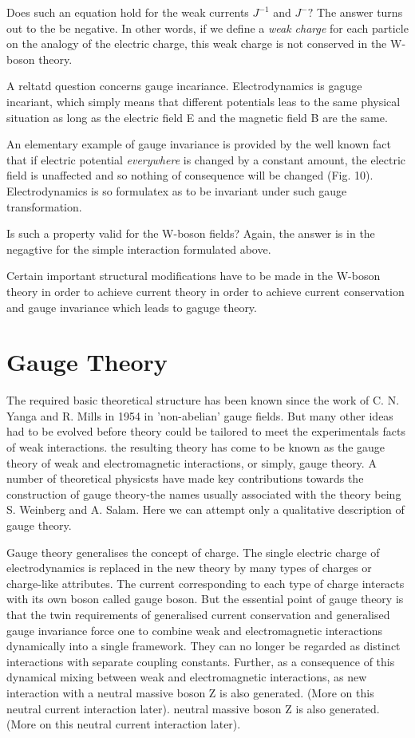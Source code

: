 Does such an equation hold for the weak currents $J^{-1}$ and $J^{-} ?$ The answer turns out to the be negative. In other words, if we define a {\it weak charge} for each particle on the analogy of the electric charge, this weak charge is not conserved in the W-boson theory.

A reltatd question concerns gauge incariance. Electrodynamics is gaguge incariant, which simply means that different potentials leas to the same physical situation as long as the electric field E and the magnetic field B are the same.

An elementary example of gauge invariance is provided by the well known fact that if electric potential {\it everywhere} is changed by a constant amount, the electric field is unaffected and so nothing of consequence will be changed (Fig. 10). Electrodynamics is so formulatex as to be invariant under such gauge transformation.

Is such a property valid for the W-boson fields? Again, the answer is in the negagtive for the simple interaction formulated above.

Certain important structural modifications have to be made in the W-boson theory in order to achieve current theory in order to achieve current conservation and gauge invariance which leads to gaguge theory.

\section*{Gauge Theory}

The required basic theoretical structure has been known since the work of C. N. Yanga and R. Mills in 1954 in 'non-abelian' gauge fields. But many other ideas had to be evolved before theory could be tailored to meet the experimentals facts of weak interactions. the resulting theory has come to be known as the gauge theory of weak and electromagnetic interactions, or simply, gauge theory. A number of theoretical physicsts have made key contributions towards the construction of gauge theory-the names usually associated with the theory being S. Weinberg and A. Salam. Here we can attempt only a qualitative description of gauge theory.

Gauge theory generalises the concept of charge. The single electric charge of electrodynamics is replaced in the new theory by many types of charges or charge-like attributes. The current corresponding to each type of charge interacts with its own boson called gauge boson. But the essential point of gauge theory is that the twin requirements of generalised current conservation and generalised gauge invariance force one to combine weak and electromagnetic interactions dynamically into a single framework. They can no longer be regarded as distinct interactions with separate coupling constants. Further, as a consequence of this dynamical mixing between weak and electromagnetic interactions, as new interaction with a neutral massive boson Z is also generated. (More on this neutral current interaction later). neutral massive boson Z is also generated. (More on this neutral current interaction later). 

